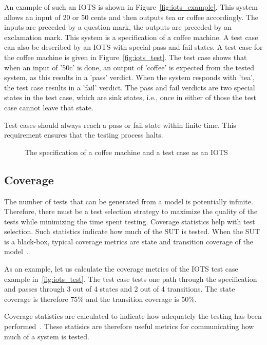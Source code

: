 An example of such an IOTS is shown in Figure~\ref{fig:iots_example}. This system allows an input of 20 or 50 cents and then outputs tea or coffee accordingly. The inputs are preceded by a question mark, the outputs are preceded by an exclamation mark. This system is a specification of a coffee machine. A test case can also be described by an IOTS with special pass and fail states. A test case for the coffee machine is given in Figure~\ref{fig:iots_test}. The test case shows that when an input of '50c' is done, an output of 'coffee' is expected from the tested system, as this results in a 'pass' verdict. When the system responds with 'tea', the test case results in a 'fail' verdict. The pass and fail verdicts are two special states in the test case, which are sink states, i.e., once in either of those the test case cannot leave that state. 

Test cases should always reach a pass or fail state within finite time. This requirement ensures that the testing process halts.
\begin{figure}[ht]
  \begin{center}
    \subfloat[An IOTS]{\label{fig:iots_example}}
  \end{center}
  \caption{The specification of a coffee machine and a test case as an IOTS}
\end{figure}

\subsection{Coverage}\label{sec:coverage}
The number of tests that can be generated from a model is potentially infinite. Therefore, there must be a test selection strategy to maximize the quality of the tests while minimizing the time spent testing. Coverage statistics help with test selection. Such statistics indicate how much of the SUT is tested. When the SUT is a black-box, typical coverage metrics are state and transition coverage of the model~\cite{Lee:testing, Nachmanson:testing, Hasan:testing}.

As an example, let us calculate the coverage metrics of the IOTS test case example in~\ref{fig:iots_test}. The test case tests one path through the specification and passes through 3 out of 4 states and 2 out of 4 transitions. The state coverage is therefore 75\% and the transition coverage is 50\%.

Coverage statistics are calculated to indicate how adequately the testing has been performed~\cite{Zhu:coverage}. These statisics are therefore useful metrics for communicating how much of a system is tested.

